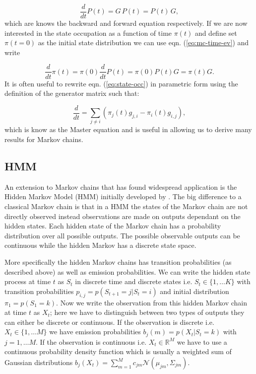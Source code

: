 \begin{equation}
  \label{eq:mc-time-ev}
  \frac{d}{dt} P(t) = G\, P(t) = P(t)\, G,
\end{equation}
which are knows the backward and forward equation respectively. If we are now interested in the state occupation as a function of time $\pi(t)$ and define set $\pi(t=0)$ as the initial state distribution we can use eqn. (\ref{eq:mc-time-ev}) and write

\begin{equation}
  \label{eq:state-occ}
  \frac{d}{dt}\pi(t) = \pi(0) \frac{d}{dt} P(t) = \pi(0) P(t) G = \pi(t)G.
\end{equation}
It is often useful to rewrite eqn. (\ref{eq:state-occ}) in parametric form using the definition of the generator matrix such that:

\begin{equation}
  \label{eq:mc-master}
  \frac{d}{dt} = \sum_{j\neq i} \left( \pi_j(t)g_{j,i} - \pi_i(t)g_{i,j} \right),
\end{equation}
which is know as the Master equation and is useful in allowing us to derive many results for Markov chains.

\subsection{HMM}
\label{sec:hmm}

An extension to Markov chains that has found widespread application is the Hidden Markov Model (HMM) initially developed by \cite{Baum:1966cy}. The big difference to a classical Markov chain is that in a HMM the states of the Markov chain are not directly observed instead observations are made on outputs dependant on the hidden states. Each hidden state of the Markov chain has a probability distribution over all possible outputs. The possible observable outputs can be continuous while the hidden Markov has a discrete state space.

More specifically the hidden Markov chains has transition probabilities (as described above) as well as emission probabilities. We can write the hidden state process at time $t$ as $S_t$ in discrete time and discrete states i.e. $S_t \in \lbrace 1, \ldots K \rbrace$ with transition probabilities $p_{i,j} = p(S_{t+1} =j | S_t =i)$ and initial distribution $\pi_1 = p(S_1 = k)$. Now we write the observation from this hidden Markov chain at time $t$ as $X_t$; here we have to distinguish between two types of outputs they can either be discrete or continuous. If the observation is discrete i.e. $X_t \in \lbrace 1, \ldots M \rbrace$ we have emission probabilities  $b_j(m) = p(X_t | S_t = k)$ with $j = 1, \ldots M$. If the observation is continuous i.e. $X_t \in \mathbb{R}^M$ we have to use a continuous probability density function which is usually a weighted sum of Gaussian distributions $b_j(X_t) = \sum_{m=1}^M c_{jm}\mathcal{N}(\mu_{jm}, \Sigma_{jm})$.

